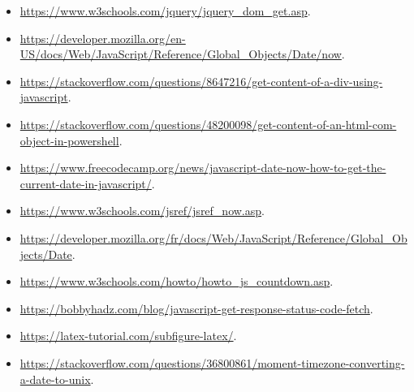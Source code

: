 \begin{itemize}
    \item \url{https://www.w3schools.com/jquery/jquery_dom_get.asp}.
    \item \url{https://developer.mozilla.org/en-US/docs/Web/JavaScript/Reference/Global_Objects/Date/now}.
    \item \url{https://stackoverflow.com/questions/8647216/get-content-of-a-div-using-javascript}.
    \item \url{https://stackoverflow.com/questions/48200098/get-content-of-an-html-com-object-in-powershell}.
    \item \url{https://www.freecodecamp.org/news/javascript-date-now-how-to-get-the-current-date-in-javascript/}.
    \item \url{https://www.w3schools.com/jsref/jsref_now.asp}.
    \item \url{https://developer.mozilla.org/fr/docs/Web/JavaScript/Reference/Global_Objects/Date}.
    \item \url{https://www.w3schools.com/howto/howto_js_countdown.asp}.
    \item \url{https://bobbyhadz.com/blog/javascript-get-response-status-code-fetch}.
    \item \url{https://latex-tutorial.com/subfigure-latex/}.
    \item \url{https://stackoverflow.com/questions/36800861/moment-timezone-converting-a-date-to-unix}.
\end{itemize}